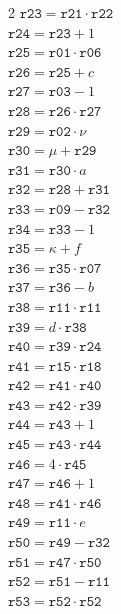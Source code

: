 \documentclass[10pt]{article}
\begin{document}
\begin{multicols}{2}
\(\mathtt{r23} = \mathtt{r21} \cdot \mathtt{r22}\)\\
\(\mathtt{r24} = \mathtt{r23} + 1\)\\
\(\mathtt{r25} = \mathtt{r01} \cdot \mathtt{r06}\)\\
\(\mathtt{r26} = \mathtt{r25} + c\)\\
\(\mathtt{r27} = \mathtt{r03} - 1\)\\
\(\mathtt{r28} = \mathtt{r26} \cdot \mathtt{r27}\)\\
\(\mathtt{r29} = \mathtt{r02} \cdot \nu\)\\
\(\mathtt{r30} = \mu + \mathtt{r29}\)\\
\(\mathtt{r31} = \mathtt{r30} \cdot a\)\\
\(\mathtt{r32} = \mathtt{r28} + \mathtt{r31}\)\\
\(\mathtt{r33} = \mathtt{r09} - \mathtt{r32}\)\\
\(\mathtt{r34} = \mathtt{r33} - 1\)\\
\(\mathtt{r35} = \kappa + f\)\\
\(\mathtt{r36} = \mathtt{r35} \cdot \mathtt{r07}\)\\
\(\mathtt{r37} = \mathtt{r36} - b\)\\
\(\mathtt{r38} = \mathtt{r11} \cdot \mathtt{r11}\)\\
\(\mathtt{r39} = d \cdot \mathtt{r38}\)\\
\(\mathtt{r40} = \mathtt{r39} \cdot \mathtt{r24}\)\\
\columnbreak
\(\mathtt{r41} = \mathtt{r15} \cdot \mathtt{r18}\)\\
\(\mathtt{r42} = \mathtt{r41} \cdot \mathtt{r40}\)\\
\(\mathtt{r43} = \mathtt{r42} \cdot \mathtt{r39}\)\\
\(\mathtt{r44} = \mathtt{r43} + 1\)\\
\(\mathtt{r45} = \mathtt{r43} \cdot \mathtt{r44}\)\\
\(\mathtt{r46} = 4 \cdot \mathtt{r45}\)\\
\(\mathtt{r47} = \mathtt{r46} + 1\)\\
\(\mathtt{r48} = \mathtt{r41} \cdot \mathtt{r46}\)\\
\(\mathtt{r49} = \mathtt{r11} \cdot e\)\\
\(\mathtt{r50} = \mathtt{r49} - \mathtt{r32}\)\\
\(\mathtt{r51} = \mathtt{r47} \cdot \mathtt{r50}\)\\
\(\mathtt{r52} = \mathtt{r51} - \mathtt{r11}\)\\
\(\mathtt{r53} = \mathtt{r52} \cdot \mathtt{r52}\)\\

\end{multicols}
\end{document}
